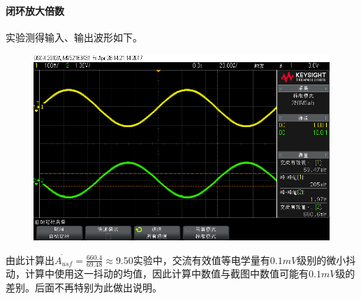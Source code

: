 \documentclass[12pt,a4paper]{article}
\begin{document}
\begin{spacing}{1.3}
\paragraph{闭环放大倍数} 实验测得输入、输出波形如下。
\begin{figure}[H]
\centering
\includegraphics[width=\textwidth]{scope_0.png}
\end{figure}
由此计算出$\dot{A_{usf}}=\frac{660.4}{69.48}\approx 9.50$实验中，交流有效值等电学量有$0.1mV$级别的微小抖动，计算中使用这一抖动的均值，因此计算中数值与截图中数值可能有$0.1mV$级的差别。后面不再特别为此做出说明。

\end{spacing}
\end{document}
